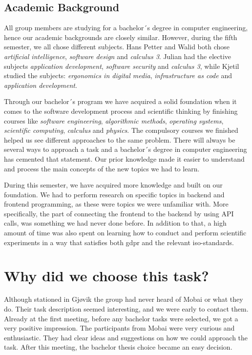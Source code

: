 \subsection{Academic Background}
\label{section:academic background}
All group members are studying for a bachelor´s degree in computer engineering, hence our academic backgrounds are closely similar. However, during the fifth semester, we all chose different subjects. Hans Petter and Walid both chose \textit{artificial intelligence}, \textit{software design} and \textit{calculus 3}. Julian had the elective subjects \textit{application development}, \textit{software security} and \textit{calculus 3}, while Kjetil studied the subjects: \textit{ergonomics in digital media}, \textit{infrastructure as code} and \textit{application development}. 

Through our bachelor´s program we have acquired a solid foundation when it comes to the software development process and scientific thinking by finishing courses like \textit{software engineering}, \textit{algorithmic methods}, \textit{operating systems}, \textit{scientific computing}, \textit{calculus} and \textit{physics}. The compulsory courses we finished helped us see different approaches to the same problem. There will always be several ways to approach a task and a bachelor´s degree in computer engineering has cemented that statement. Our prior knowledge made it easier to understand and process the main concepts of the new topics we had to learn. 

During this semester, we have acquired more knowledge and built on our foundation. We had to perform research on specific topics in backend and frontend programming, as these were topics we were unfamiliar with. More specifically, the part of connecting the frontend to the backend by using API calls, was something we had never done before. In addition to that, a high amount of time was also spent on learning how to conduct and perform scientific experiments in a way that satisfies both \acrfull{gdpr} and the relevant \acrshort{iso}-standards.  

\section{Why did we choose this task?}
Although stationed in Gjøvik the group had never heard of Mobai or what they do. Their task description seemed interesting, and we were early to contact them. Already at the first meeting, before any bachelor tasks were selected, we got a very positive impression. The participants from Mobai were very curious and enthusiastic. They had clear ideas and suggestions on how we could approach the task. After this meeting, the bachelor thesis choice became an easy decision. 

